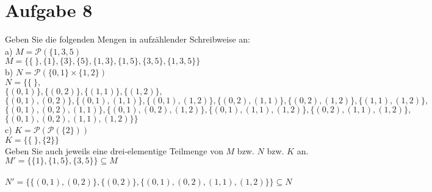 \section*{Aufgabe 8}

Geben Sie die folgenden Mengen in aufzählender Schreibweise an:\\

a) $M = \mathcal{P}(\{1,3,5)$\\

$M = \{ \{ \ \}, \{1\}, \{3\}, \{5\}, \{1,3\}, \{1,5\}, \{3,5\}, \{1,3,5\}\}$\\

b) $N = \mathcal{P}(\{0,1\} \times \{1,2\})$\\

$N = \{ \{ \ \},$\\
\hspace*{2.8em}$\{(0,1)\}, \{(0,2)\}, \{(1,1)\}, \{(1,2)\},$\\
\hspace*{2.8em}$\{(0,1),(0,2)\}, \{(0,1),(1,1)\}, \{(0,1),(1,2)\}, \{(0,2),(1,1)\}, \{(0,2),(1,2)\}, \{(1,1),(1,2)\},$\\
\hspace*{2.8em}$\{(0,1),(0,2),(1,1)\}, \{(0,1),(0,2),(1,2)\}, \{(0,1),(1,1),(1,2)\}, \{(0,2),(1,1),(1,2)\},$\\
\hspace*{2.8em}$\{(0,1),(0,2),(1,1),(1,2)\}\}$\\

c) $K = \mathcal{P}(\mathcal{P}(\{2\}))$\\

$K = \{\{ \ \}, \{2\} \}$\\

Geben Sie auch jeweils eine drei-elementige Teilmenge von $M$ bzw. $N$ bzw. $K$ an.\\

$M' = \{ \{1\}, \{1,5\}, \{3,5\} \} \subseteq M$\\~\\

$N' = \{ \{(0,1),(0,2)\}, \{(0,2)\}, \{(0,1),(0,2),(1,1),(1,2)\} \} \subseteq N$\\~\\